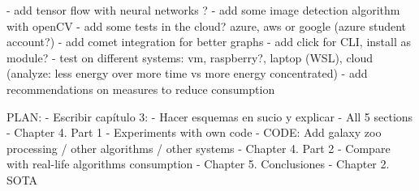 - add tensor flow with neural networks ?
- add some image detection algorithm with openCV
- add some tests in the cloud? azure, aws or google (azure student account?)
- add comet integration for better graphs
- add click for CLI, install as module?
- test on different systems: vm, raspberry?, laptop (WSL), cloud (analyze: less energy over more time vs more energy concentrated)
- add recommendations on measures to reduce consumption


PLAN:
- Escribir capítulo 3:
   - Hacer esquemas en sucio y explicar
   - All 5 sections
- Chapter 4. Part 1 - Experiments with own code
- CODE: Add galaxy zoo processing / other algorithms / other systems
- Chapter 4. Part 2 - Compare with real-life algorithms consumption
- Chapter 5. Conclusiones
- Chapter 2. SOTA